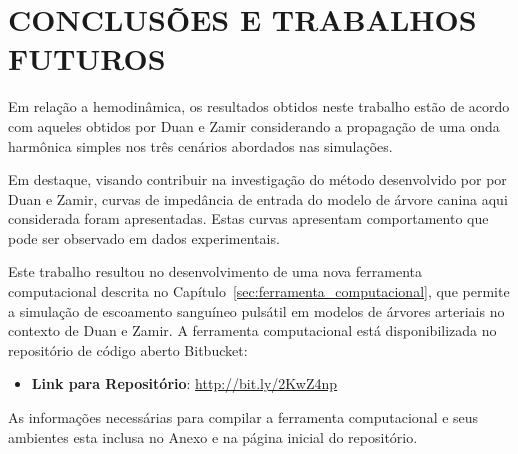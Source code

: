\chapter{CONCLUSÕES E TRABALHOS FUTUROS}\label{sec:conclusoes}
\justifying


Em relação a hemodinâmica, os resultados obtidos neste trabalho estão de acordo com aqueles obtidos por Duan e Zamir\textcolor{blue}{ \cite{Duan1992} } considerando a propagação de uma onda harmônica simples nos três cenários abordados nas simulações. 

Em destaque, visando contribuir na investigação do método desenvolvido por por Duan e Zamir, curvas de impedância de entrada do modelo de árvore canina aqui considerada foram apresentadas. Estas curvas apresentam comportamento que pode ser observado em dados experimentais.

Este trabalho resultou no desenvolvimento de uma nova ferramenta computacional descrita no Capítulo~\ref{sec:ferramenta_computacional}, que permite a simulação de escoamento sanguíneo pulsátil em modelos de árvores arteriais no contexto de Duan e Zamir. A ferramenta computacional está disponibilizada no repositório de código aberto Bitbucket:

\begin{itemize}
	\item \textbf{Link para Repositório}: \href{http://bit.ly/2KwZ4np}{http://bit.ly/2KwZ4np}
\end{itemize}

As informações necessárias para compilar a ferramenta computacional e seus ambientes esta inclusa no Anexo e na página inicial do repositório.



